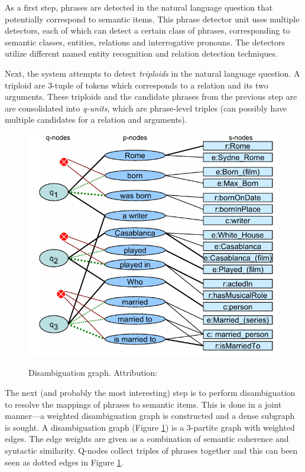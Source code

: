 \documentclass[a4paper, twoside, 12pt]{report}
\begin{document}
As a first step, phrases are detected in the natural language question that potentially correspond to semantic items. This phrase detector unit uses multiple detectors, each of which can detect a certain class of phrases, corresponding to semantic classes, entities, relations and interrogative pronouns. The detectors utilize different named entity recognition and relation detection techniques.

Next, the system attempts to detect \emph{triploids} in the natural language question. A triploid are 3-tuple of tokens which corresponds to a relation and its two arguments. These triploids and the candidate phrases from the previous step are are consolidated into \emph{q-units}, which are phrase-level triples (can possibly have multiple candidates for a relation and arguments).

\begin{figure}
  \center
  \includegraphics[scale=0.5]{./deanna1.png}
  \label{fig:disgraph}
  \caption{Disambiguation graph. Attribution: \cite{yahya2012deep}}
\end{figure}

The next (and probably the most interesting) step is to perform disambiguation to resolve the mappings of phrases to semantic items. This is done in a joint manner---a weighted disambiguation graph is constructed and a dense subgraph is sought. A disambiguation graph (Figure \ref{fig:disgraph}) is a 3-partite graph with weighted edges. The edge weights are given as a combination of semantic coherence and syntactic similarity. Q-nodes collect triples of phrases together and this can been seen as dotted edges in Figure \ref{fig:disgraph}.
\end{document}
